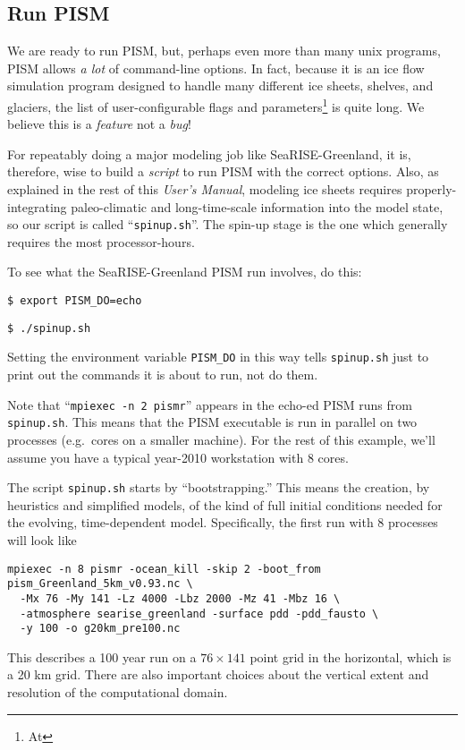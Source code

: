 \subsection{Run PISM}

We are ready to run PISM, but, perhaps even more than many unix programs, PISM allows \emph{a lot} of command-line options.  In fact, because it is an ice flow simulation program designed to handle many different ice sheets, shelves, and glaciers, the list of user-configurable flags and parameters\footnote{At }
is quite long.  We believe this is a \emph{feature} not a \emph{bug}!

For repeatably doing a major modeling job like SeaRISE-Greenland, it is, therefore, wise to build a \emph{script} to run PISM with the correct options.  Also, as explained in the rest of this \emph{User's Manual}, modeling ice sheets requires properly-integrating paleo-climatic and long-time-scale information into the model state, so our script is called ``\verb|spinup.sh|''.  The spin-up stage is the one which generally requires the most processor-hours.

To see what the SeaRISE-Greenland PISM run involves, do this:

\verb|$ export PISM_DO=echo|

\verb+$ ./spinup.sh+

\noindent Setting the environment variable \verb|PISM_DO| in this way tells \verb|spinup.sh| just to print out the commands it is about to run, not do them.

Note that ``\verb|mpiexec -n 2 pismr|'' appears in the echo-ed PISM runs from \verb|spinup.sh|.  This means that the PISM executable is run in parallel on two processes (e.g.~cores on a smaller machine).  For the rest of this example, we'll assume you have a typical year-2010 workstation with 8 cores.

The script \verb|spinup.sh| starts by ``bootstrapping.''  This means the creation, by heuristics and simplified models, of the kind of full initial conditions needed for the evolving, time-dependent model.  Specifically, the first run with 8 processes will look like
\begin{verbatim}
mpiexec -n 8 pismr -ocean_kill -skip 2 -boot_from pism_Greenland_5km_v0.93.nc \
  -Mx 76 -My 141 -Lz 4000 -Lbz 2000 -Mz 41 -Mbz 16 \
  -atmosphere searise_greenland -surface pdd -pdd_fausto \
  -y 100 -o g20km_pre100.nc
\end{verbatim}
This describes a 100 year run on a $76\times 141$ point grid in the horizontal, which is a 20 km grid.  There are also important choices about the vertical extent and resolution of the computational domain.



